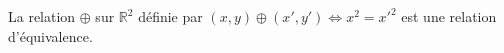 La relation $\oplus$ sur $\mathbb R^2$ définie par $(x,y)\oplus (x',y') \iff x^2=x'^2$ est une relation d'équivalence.

\begin{reponses}
\end{reponses}

